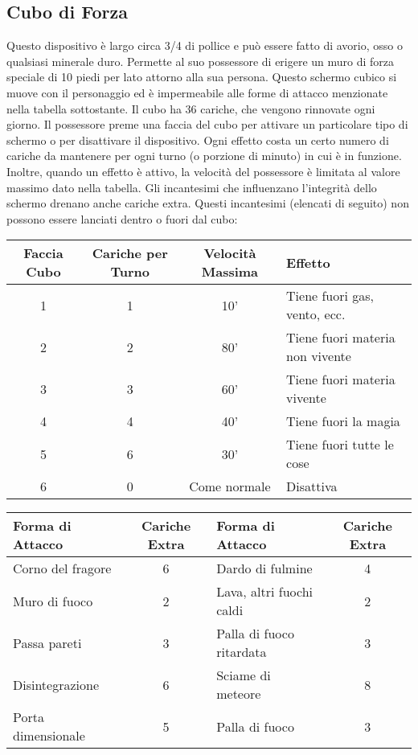 \documentclass{article}
\begin{document}
\begin{multicols}{2}
\subsection{Cubo di Forza}
Questo dispositivo è largo circa 3/4 di pollice e può essere fatto di avorio, osso o qualsiasi minerale duro. Permette al suo possessore di erigere un muro di forza speciale di 10 piedi per lato attorno alla sua persona. Questo schermo cubico si muove con il personaggio ed è impermeabile alle forme di attacco menzionate nella tabella sottostante. Il cubo ha 36 cariche, che vengono rinnovate ogni giorno. Il possessore preme una faccia del cubo per attivare un particolare tipo di schermo o per disattivare il dispositivo. Ogni effetto costa un certo numero di cariche da mantenere per ogni turno (o porzione di minuto) in cui è in funzione. Inoltre, quando un effetto è attivo, la velocità del possessore è limitata al valore massimo dato nella tabella. Gli incantesimi che influenzano l'integrità dello schermo drenano anche cariche extra. Questi incantesimi (elencati di seguito) non possono essere lanciati dentro o fuori dal cubo:

\begin{table}[h]
\centering
\begin{tabular}{|c|c|c|l|}
\hline
\textbf{Faccia Cubo} & \textbf{Cariche per Turno} & \textbf{Velocità Massima} & \textbf{Effetto} \\
\hline
1 & 1 & 10' & Tiene fuori gas, vento, ecc. \\
2 & 2 & 80' & Tiene fuori materia non vivente \\
3 & 3 & 60' & Tiene fuori materia vivente \\
4 & 4 & 40' & Tiene fuori la magia \\
5 & 6 & 30' & Tiene fuori tutte le cose \\
6 & 0 & Come normale & Disattiva \\
\hline
\end{tabular}

\end{table}

\begin{table}[h]
\centering
\begin{tabular}{|l|c|l|c|}
\hline
\textbf{Forma di Attacco} & \textbf{Cariche Extra} & \textbf{Forma di Attacco} & \textbf{Cariche Extra} \\
\hline
Corno del fragore & 6 & Dardo di fulmine & 4 \\
Muro di fuoco & 2 & Lava, altri fuochi caldi & 2 \\
Passa pareti & 3 & Palla di fuoco ritardata & 3 \\
Disintegrazione & 6 & Sciame di meteore & 8 \\
Porta dimensionale & 5 & Palla di fuoco & 3 \\
\hline
\end{tabular}


\end{table}
\end{multicols}
\end{document}
